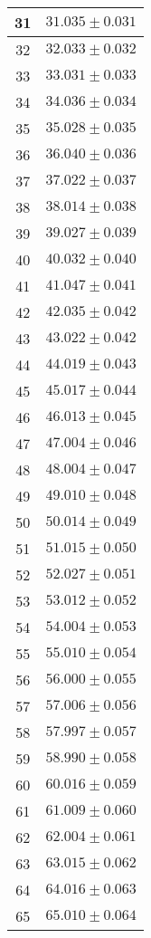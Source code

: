 \documentclass[prb,12pt]{revtex4-2}
\theoremstyle{definition}
\theoremstyle{definition}
\begin{document}
\begin{longtable}{cc}
	31 & $31.035\pm 0.031$ \\\midrule
	32 & $32.033\pm 0.032$ \\\midrule
	33 & $33.031\pm 0.033$ \\\midrule
	34 & $34.036\pm 0.034$ \\\midrule
	35 & $35.028\pm 0.035$ \\\midrule
	36 & $36.040\pm 0.036$ \\\midrule
	37 & $37.022\pm 0.037$ \\\midrule
	38 & $38.014\pm 0.038$ \\\midrule
	39 & $39.027\pm 0.039$ \\\midrule
	40 & $40.032\pm 0.040$ \\\midrule
	41 & $41.047\pm 0.041$ \\\midrule
	42 & $42.035\pm 0.042$ \\\midrule
	43 & $43.022\pm 0.042$ \\\midrule
	44 & $44.019\pm 0.043$ \\\midrule
	45 & $45.017\pm 0.044$ \\\midrule
	46 & $46.013\pm 0.045$ \\\midrule
	47 & $47.004\pm 0.046$ \\\midrule
	48 & $48.004\pm 0.047$ \\\midrule
	49 & $49.010\pm 0.048$ \\\midrule
	50 & $50.014\pm 0.049$ \\\midrule
	51 & $51.015\pm 0.050$ \\\midrule
	52 & $52.027\pm 0.051$ \\\midrule
	53 & $53.012\pm 0.052$ \\\midrule
	54 & $54.004\pm 0.053$ \\\midrule
	55 & $55.010\pm 0.054$ \\\midrule
	56 & $56.000\pm 0.055$ \\\midrule
	57 & $57.006\pm 0.056$ \\\midrule
	58 & $57.997\pm 0.057$ \\\midrule
	59 & $58.990\pm 0.058$ \\\midrule
	60 & $60.016\pm 0.059$ \\\midrule
	61 & $61.009\pm 0.060$ \\\midrule
	62 & $62.004\pm 0.061$ \\\midrule
	63 & $63.015\pm 0.062$ \\\midrule
	64 & $64.016\pm 0.063$ \\\midrule
	65 & $65.010\pm 0.064$ \\\midrule

\end{longtable}
\end{document}
